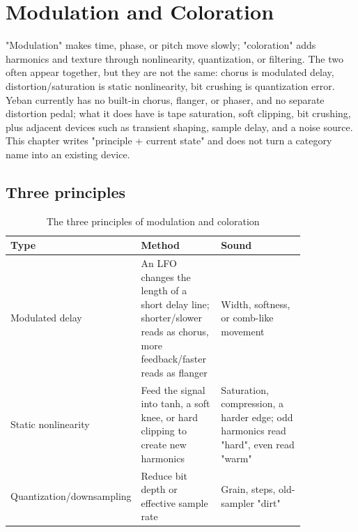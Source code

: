 \chapter{Modulation and Coloration}
\label{chap:modulation-coloration}


"Modulation" makes time, phase, or pitch move slowly; "coloration" adds harmonics and texture through nonlinearity, quantization, or filtering. The two often appear together, but they are not the same: chorus is modulated delay, distortion/saturation is static nonlinearity, bit crushing is quantization error. Yeban currently has no built-in chorus, flanger, or phaser, and no separate distortion pedal; what it does have is tape saturation, soft clipping, bit crushing, plus adjacent devices such as transient shaping, sample delay, and a noise source. This chapter writes "principle + current state" and does not turn a category name into an existing device.

\section{Three principles}

\begin{table}[htbp]
\centering
\small
\begin{tabular}{@{}p{0.14\linewidth}p{0.30\linewidth}p{0.40\linewidth}@{}}
\hline
Type & Method & Sound \\
\hline
Modulated delay & An LFO changes the length of a short delay line; shorter/slower reads as chorus, more feedback/faster reads as flanger & Width, softness, or comb-like movement \\
Static nonlinearity & Feed the signal into tanh, a soft knee, or hard clipping to create new harmonics & Saturation, compression, a harder edge; odd harmonics read "hard", even read "warm" \\
Quantization/\allowbreak downsampling & Reduce bit depth or effective sample rate & Grain, steps, old-sampler "dirt" \\
\hline
\end{tabular}
\caption{The three principles of modulation and coloration}
\label{tab:mod-coloration-principles}
\end{table}

